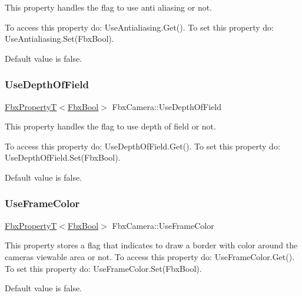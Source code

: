 This property handles the flag to use anti aliasing or not.

To access this property do\+: Use\+Antialiasing.\+Get(). To set this property do\+: Use\+Antialiasing.\+Set(\+Fbx\+Bool).

Default value is false. \mbox{\label{class_fbx_camera_a5b101aeb02696ef3e140505f01e6f797}} 
\subsubsection{\texorpdfstring{Use\+Depth\+Of\+Field}{UseDepthOfField}}
{\footnotesize\ttfamily \hyperlink{class_fbx_property_t}{Fbx\+PropertyT}$<$\hyperlink{fbxtypes_8h_a92e0562b2fe33e76a242f498b362262e}{Fbx\+Bool}$>$ Fbx\+Camera\+::\+Use\+Depth\+Of\+Field}

This property handles the flag to use depth of field or not.

To access this property do\+: Use\+Depth\+Of\+Field.\+Get(). To set this property do\+: Use\+Depth\+Of\+Field.\+Set(\+Fbx\+Bool).

Default value is false. \mbox{\label{class_fbx_camera_a891e6eb1c91dd3a47dc05547149825e3}} 
\subsubsection{\texorpdfstring{Use\+Frame\+Color}{UseFrameColor}}
{\footnotesize\ttfamily \hyperlink{class_fbx_property_t}{Fbx\+PropertyT}$<$\hyperlink{fbxtypes_8h_a92e0562b2fe33e76a242f498b362262e}{Fbx\+Bool}$>$ Fbx\+Camera\+::\+Use\+Frame\+Color}

This property stores a flag that indicates to draw a border with color around the camera\textquotesingle{}s viewable area or not. To access this property do\+: Use\+Frame\+Color.\+Get(). To set this property do\+: Use\+Frame\+Color.\+Set(\+Fbx\+Bool).

Default value is false. \mbox{\label{class_fbx_camera_a73d5041546de951978b9065f7b0789a4}} 
